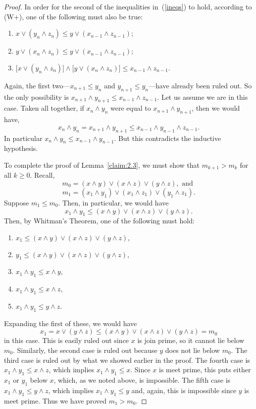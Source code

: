 \begin{proof}
In order for the second of the inequalities in~(\ref{ineqs}) to hold, 
according to (W+), one of the following must also be true:
\begin{enumerate}
\item $x \vee (y_{n} \wedge z_{n})\leq y \vee (x_{n-1} \wedge z_{n-1})$;
\item $y \vee (x_{n} \wedge z_{n}) \leq y \vee (x_{n-1} \wedge z_{n-1})$;
\item $\bigl[x \vee (y_{n} \wedge z_{n})\bigr] \wedge 
\bigl[y \vee (x_{n} \wedge z_{n})\bigr] \leq x_{n-1} \wedge z_{n-1}$.
\end{enumerate}
Again, the first two---$x_{n+1}\leq y_n$ and $y_{n+1} \leq y_{n}$---have already 
been ruled out. So the only possibility is
$x_{n+1} \wedge y_{n+1} \leq x_{n-1} \wedge z_{n-1}$. Let us assume we are in this case.
Taken all together, if 
$x_n \wedge y_n$ were equal to  $x_{n+1} \wedge y_{n+1}$,
then we would have,
\[
x_n \wedge y_n = x_{n+1} \wedge y_{n+1} \leq x_{n-1} \wedge y_{n-1} \wedge z_{n-1}.
\]
In particular $x_n \wedge y_n \leq x_{n-1} \wedge y_{n-1}$.  But this contradicts 
the inductive hypothesis. 


To complete the proof of  Lemma~\ref{claim:2.3}, we must show that
$m_{k+1} > m_k$ for all $k\geq 0$. Recall,
\[
  m_0 = (x \wedge y) \vee (x \wedge z) \vee (y \wedge z), \text{ and }
  \]
\[
  m_1 = (x_1 \wedge y_1) \vee (x_1 \wedge z_1) \vee (y_1 \wedge z_1).
\]
Suppose $m_1 \leq m_0$.  Then, in particular, we would have
\[
x_1 \wedge y_1 \leq  (x \wedge y) \vee (x \wedge z) \vee (y \wedge z).
\]
Then, by Whitman's Theorem, one of the following must hold:
\begin{enumerate}
\item $x_1 \leq  (x \wedge y) \vee (x \wedge z) \vee (y \wedge z)$,
\item $y_1 \leq  (x \wedge y) \vee (x \wedge z) \vee (y \wedge z)$,
\item $x_1 \wedge y_1 \leq  x \wedge y$,
\item $x_1 \wedge y_1 \leq x \wedge z$,
\item $x_1 \wedge y_1 \leq  y \wedge z$.
\end{enumerate}
Expanding the first of these, we would have
\[
x_1 = x \vee (y \wedge z) \leq  (x \wedge y) \vee (x \wedge z) \vee (y \wedge z) = m_0
\]
in this case.  This is easily ruled out since $x$ is join prime, so it cannot lie below $m_0$.
Similarly, the second case is ruled out because $y$ does not lie below $m_0$.
The third case is ruled out by what we showed earlier in the proof.
The fourth case is $x_1 \wedge y_1 \leq x \wedge z$, 
which implies $x_1 \wedge y_1 \leq x$. Since $x$ is meet prime, this puts either $x_1$ or $y_1$ below $x$,
which, as we noted above, is impossible.
The fifth case is $x_1 \wedge y_1 \leq y \wedge z$, 
which implies $x_1 \wedge y_1 \leq y$ and, again, this is impossible since $y$ is meet prime.
Thus we have proved $m_1 > m_0$.  


\end{proof}
